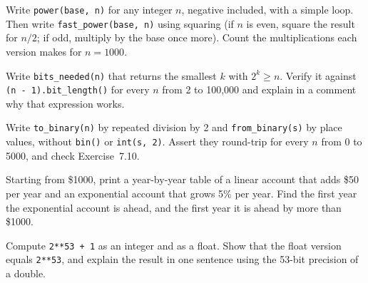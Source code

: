 \begin{codeexercises}
\item Write \lstinline!power(base, n)! for any integer $n$, negative included, with a simple loop. Then write \lstinline!fast_power(base, n)! using squaring (if $n$ is even, square the result for $n/2$; if odd, multiply by the base once more). Count the multiplications each version makes for $n = 1000$.
\item Write \lstinline!bits_needed(n)! that returns the smallest $k$ with $2^k \ge n$. Verify it against \lstinline!(n - 1).bit_length()! for every $n$ from 2 to 100{,}000 and explain in a comment why that expression works.
\item Write \lstinline!to_binary(n)! by repeated division by 2 and \lstinline!from_binary(s)! by place values, without \lstinline!bin()! or \lstinline!int(s, 2)!. Assert they round-trip for every $n$ from 0 to 5000, and check Exercise~7.10.
\item Starting from \$1000, print a year-by-year table of a linear account that adds \$50 per year and an exponential account that grows 5\% per year. Find the first year the exponential account is ahead, and the first year it is ahead by more than \$1000.
\item Compute \lstinline!2**53 + 1! as an integer and as a float. Show that the float version equals \lstinline!2**53!, and explain the result in one sentence using the 53-bit precision of a double.
\end{codeexercises}

